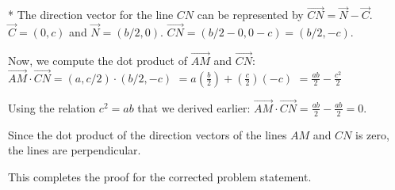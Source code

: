 * The direction vector for the line $CN$ can be represented by $\vec{CN} = \vec{N} - \vec{C}$.
$\vec{C} = (0, c)$ and $\vec{N} = (b/2, 0)$.
$\vec{CN} = (b/2 - 0, 0 - c) = (b/2, -c)$.

Now, we compute the dot product of $\vec{AM}$ and $\vec{CN}$:
$\vec{AM} \cdot \vec{CN} = (a, c/2) \cdot (b/2, -c)$
$= a\left(\frac{b}{2}\right) + \left(\frac{c}{2}\right)(-c)$
$= \frac{ab}{2} - \frac{c^2}{2}$

Using the relation $c^2=ab$ that we derived earlier:
$\vec{AM} \cdot \vec{CN} = \frac{ab}{2} - \frac{ab}{2} = 0$.

Since the dot product of the direction vectors of the lines $AM$ and $CN$ is zero, the lines are perpendicular.

This completes the proof for the corrected problem statement.